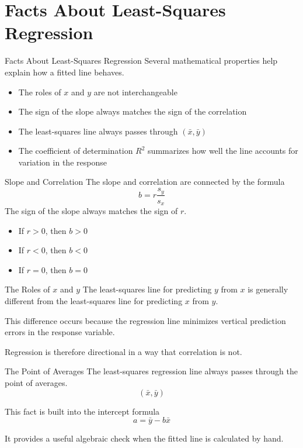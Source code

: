 \documentclass[aspectratio=169]{beamer}
\begin{document}
\section{Facts About Least-Squares Regression}

\begin{frame}{Facts About Least-Squares Regression}
Several mathematical properties help explain how a fitted line behaves.
\begin{itemize}
  \item The roles of $x$ and $y$ are not interchangeable
  \item The sign of the slope always matches the sign of the correlation
  \item The least-squares line always passes through $(\bar x,\bar y)$
  \item The coefficient of determination $R^2$ summarizes how well the line accounts for variation in the response
\end{itemize}
\end{frame}

\begin{frame}{Slope and Correlation}
The slope and correlation are connected by the formula
$$b=r\frac{s_y}{s_x}
$$
The sign of the slope always matches the sign of $r$.
\begin{itemize}
  \item If $r>0$, then $b>0$
  \item If $r<0$, then $b<0$
  \item If $r=0$, then $b=0$
\end{itemize}
\end{frame}

\begin{frame}{The Roles of $x$ and $y$}
The least-squares line for predicting $y$ from $x$ is generally different from the least-squares line for predicting $x$ from $y$.

\vspace{0.15cm}
This difference occurs because the regression line minimizes vertical prediction errors in the response variable.

\vspace{0.15cm}
Regression is therefore directional in a way that correlation is not.
\end{frame}

\begin{frame}{The Point of Averages}
The least-squares regression line always passes through the point of averages.
$$(\bar x,\bar y)$$

This fact is built into the intercept formula
$$a=\bar y-b\bar x$$

It provides a useful algebraic check when the fitted line is calculated by hand.
\end{frame}
\end{document}
